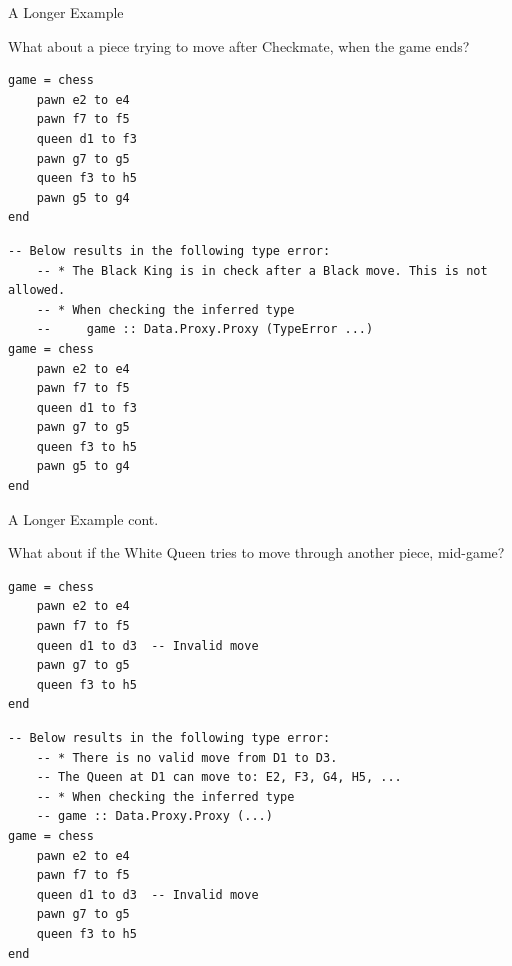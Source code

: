 \documentclass{beamer}
\begin{document}
\begin{frame}[fragile]{A Longer Example}

What about a piece trying to move after Checkmate, when the game ends?

\begin{overprint}

\begin{lstlisting}
game = chess
    pawn e2 to e4
    pawn f7 to f5
    queen d1 to f3
    pawn g7 to g5
    queen f3 to h5
    pawn g5 to g4
end
\end{lstlisting}

\begin{lstlisting}
-- Below results in the following type error:
    -- * The Black King is in check after a Black move. This is not allowed.
    -- * When checking the inferred type
    --     game :: Data.Proxy.Proxy (TypeError ...)
game = chess
    pawn e2 to e4
    pawn f7 to f5
    queen d1 to f3
    pawn g7 to g5
    queen f3 to h5
    pawn g5 to g4
end
\end{lstlisting}

\end{overprint}

\end{frame}

\begin{frame}[fragile]{A Longer Example cont.}

What about if the White Queen tries to move through another piece, mid-game?

\begin{overprint}

\begin{lstlisting}
game = chess
    pawn e2 to e4
    pawn f7 to f5
    queen d1 to d3  -- Invalid move
    pawn g7 to g5
    queen f3 to h5
end
\end{lstlisting}

\begin{lstlisting}
-- Below results in the following type error:
    -- * There is no valid move from D1 to D3.
    -- The Queen at D1 can move to: E2, F3, G4, H5, ...
    -- * When checking the inferred type
    -- game :: Data.Proxy.Proxy (...)
game = chess
    pawn e2 to e4
    pawn f7 to f5
    queen d1 to d3  -- Invalid move
    pawn g7 to g5
    queen f3 to h5
end
\end{lstlisting}

\end{overprint}

\end{frame}
\end{document}
